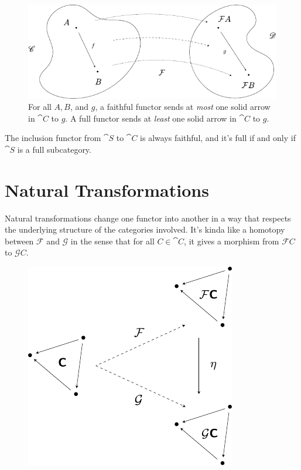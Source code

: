 \documentclass[twoside,10pt]{report}
\begin{document}
\begin{figure}[H]
	\centering
	\includegraphics[scale=1]{fig/faith-full.pdf}
	\caption{For all $A, B$, and $g$, a faithful functor sends at \textit{most} one solid arrow in $\cat{C}$ to $g$. A full functor sends at \textit{least} one solid arrow in $\cat{C}$ to $g$.}
\end{figure}

\begin{ex}
The inclusion functor from $\cat{S}$ to $\cat{C}$ is always faithful, and it's full if and only if $\cat{S}$ is a full subcategory.
\end{ex}


\section{Natural Transformations}

Natural transformations change one functor into another in a way that respects the underlying structure of the categories involved. It's kinda like a homotopy between $\mathcal{F}$ and $\mathcal{G}$ in the sense that for all $C \in \cat{C}$, it gives a morphism from $\mathcal{F}C$ to $\mathcal{G}C$.
\begin{figure}[H]
	\centering
	\includegraphics[scale=1]{fig/nat-trans.pdf}
\end{figure}
\end{document}
